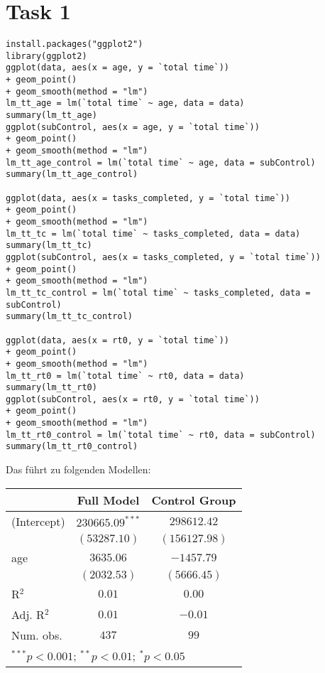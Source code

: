 \documentclass{article}
\begin{document}
	\section*{Task 1}
	\begin{lstlisting}
install.packages("ggplot2")
library(ggplot2)
ggplot(data, aes(x = age, y = `total time`)) 
+ geom_point() 
+ geom_smooth(method = "lm")
lm_tt_age = lm(`total time` ~ age, data = data)
summary(lm_tt_age)
ggplot(subControl, aes(x = age, y = `total time`)) 
+ geom_point() 
+ geom_smooth(method = "lm")
lm_tt_age_control = lm(`total time` ~ age, data = subControl)
summary(lm_tt_age_control)

ggplot(data, aes(x = tasks_completed, y = `total time`)) 
+ geom_point() 
+ geom_smooth(method = "lm")
lm_tt_tc = lm(`total time` ~ tasks_completed, data = data)
summary(lm_tt_tc)
ggplot(subControl, aes(x = tasks_completed, y = `total time`)) 
+ geom_point() 
+ geom_smooth(method = "lm")
lm_tt_tc_control = lm(`total time` ~ tasks_completed, data = subControl)
summary(lm_tt_tc_control)

ggplot(data, aes(x = rt0, y = `total time`)) 
+ geom_point() 
+ geom_smooth(method = "lm")
lm_tt_rt0 = lm(`total time` ~ rt0, data = data)
summary(lm_tt_rt0)
ggplot(subControl, aes(x = rt0, y = `total time`)) 
+ geom_point() 
+ geom_smooth(method = "lm")
lm_tt_rt0_control = lm(`total time` ~ rt0, data = subControl)
summary(lm_tt_rt0_control)
	\end{lstlisting}
	Das führt zu folgenden Modellen:
\begin{center}
\begin{tabular}{l c c}
\hline
 & Full Model & Control Group \\
\hline
(Intercept) & $230665.09^{***}$ & $298612.42$   \\
            & $(53287.10)$      & $(156127.98)$ \\
age         & $3635.06$         & $-1457.79$    \\
            & $(2032.53)$       & $(5666.45)$   \\
\hline
R$^2$       & $0.01$            & $0.00$        \\
Adj. R$^2$  & $0.01$            & $-0.01$       \\
Num. obs.   & $437$             & $99$          \\
\hline
\multicolumn{3}{l}{\scriptsize{$^{***}p<0.001$; $^{**}p<0.01$; $^{*}p<0.05$}}
\end{tabular}
\end{center}
\end{document}

